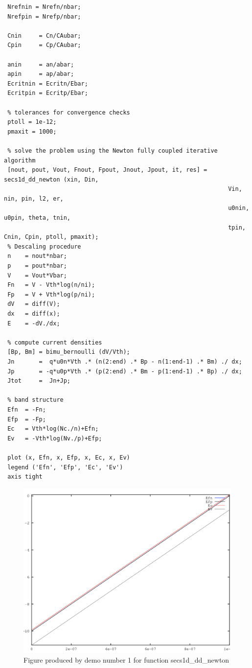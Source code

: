 \begin{verbatim}
 Nrefnin = Nrefn/nbar;
 Nrefpin = Nrefp/nbar;
 
 Cnin     = Cn/CAubar;
 Cpin     = Cp/CAubar;
 
 anin     = an/abar;
 apin     = ap/abar;
 Ecritnin = Ecritn/Ebar;
 Ecritpin = Ecritp/Ebar;
 
 % tolerances for convergence checks
 ptoll = 1e-12;
 pmaxit = 1000;
 
 % solve the problem using the Newton fully coupled iterative algorithm
 [nout, pout, Vout, Fnout, Fpout, Jnout, Jpout, it, res] = secs1d_dd_newton (xin, Din, 
                                                                Vin, nin, pin, l2, er, 
                                                                u0nin, u0pin, theta, tnin, 
                                                                tpin, Cnin, Cpin, ptoll, pmaxit);
 % Descaling procedure
 n    = nout*nbar;
 p    = pout*nbar;
 V    = Vout*Vbar;
 Fn   = V - Vth*log(n/ni);
 Fp   = V + Vth*log(p/ni);
 dV   = diff(V);
 dx   = diff(x);
 E    = -dV./dx;
 
 % compute current densities 
 [Bp, Bm] = bimu_bernoulli (dV/Vth);
 Jn       =  q*u0n*Vth .* (n(2:end) .* Bp - n(1:end-1) .* Bm) ./ dx; 
 Jp       = -q*u0p*Vth .* (p(2:end) .* Bm - p(1:end-1) .* Bp) ./ dx;
 Jtot     =  Jn+Jp;
 
 % band structure
 Efn  = -Fn;
 Efp  = -Fp;
 Ec   = Vth*log(Nc./n)+Efn;
 Ev   = -Vth*log(Nv./p)+Efp;

 plot (x, Efn, x, Efp, x, Ec, x, Ev)
 legend ('Efn', 'Efp', 'Ec', 'Ev')
 axis tight
\end{verbatim}

\begin{figure}\centering
\includegraphics[width=.7\linewidth]{function/images/secs1d_dd_newton_819.png}
\caption{Figure produced by demo number 1 for function secs1d\_dd\_newton}
\label{fig:secs1d_dd_newton_figure_1}
\end{figure}
\clearpage
